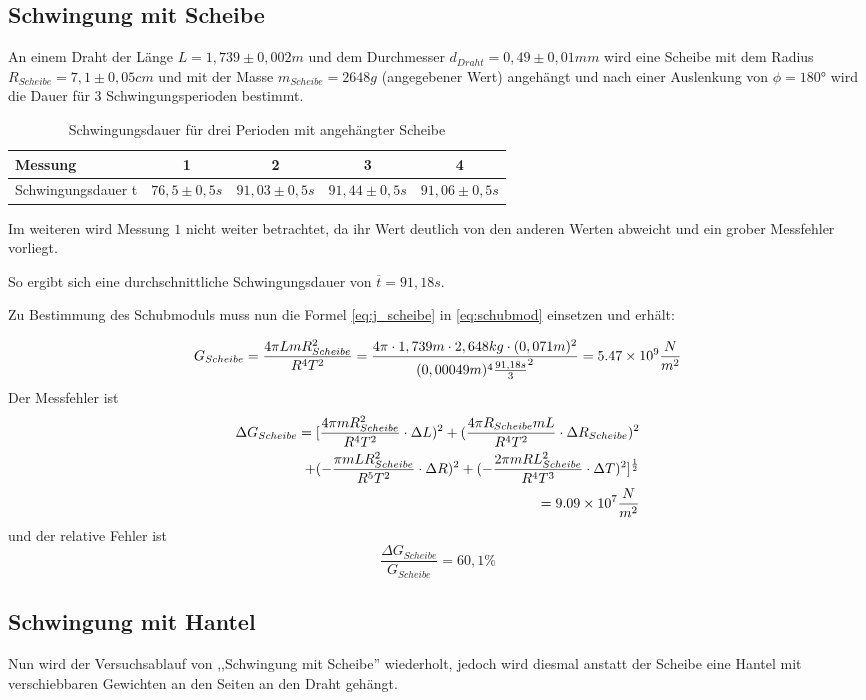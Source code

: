 \subsection{Schwingung mit Scheibe}
An einem Draht der Länge $L=1,739 \pm 0,002 m$ und dem Durchmesser $d_{Draht}= 0,49 \pm 0,01 mm$ wird eine Scheibe mit dem Radius $R_{Scheibe}= 7,1 \pm 0,05 cm$ und mit der Masse $m_{Scheibe}=2648g$ (angegebener Wert) angehängt und nach einer Auslenkung von $\phi =180$° wird die Dauer für 3 Schwingungsperioden bestimmt.
\begin{table}[H]
  \centering
  \begin{tabular}{l | c | c | c | c}
    Messung & 1 & 2& 3 & 4 \\ \hline
    Schwingungsdauer t & $76,5 \pm 0,5 s $ & $91,03\pm 0,5 s $ & $91,44 \pm 0,5 s $ & $91,06\pm 0,5 s $
  \end{tabular}
  \caption{Schwingungsdauer für drei Perioden mit angehängter Scheibe}
  \label{tab:schwingdauerscheibe}
\end{table}
Im weiteren wird Messung $1$ nicht weiter betrachtet, da ihr Wert deutlich von den anderen Werten abweicht und ein grober Messfehler vorliegt.

So ergibt sich eine durchschnittliche  Schwingungsdauer von $\overline{t}=91,18s$.

Zu Bestimmung des Schubmoduls muss nun die Formel \ref{eq:j_scheibe} in \ref{eq:schubmod} einsetzen und erhält:

\begin{equation}
G_{Scheibe}=\frac{4\pi LmR_{Scheibe}^2}{R^4T^2}= \frac{4\pi\cdot1,739m\cdot2,648kg\cdot(0,071m)^2}{(0,00049m)^4\frac{91,18s}{3}^2}=\num{5,47d9} \frac{N}{m^2}
\end{equation}
Der Messfehler ist
\begin{equation}
\begin{split}
\Delta G_{Scheibe}=[\frac{4\pi mR_{Scheibe}^2}{R^4T^2}\cdot\Delta L)^2+(\frac{4\pi R_{Scheibe}mL}{R^4T^2}\cdot\Delta R_{Scheibe})^2\\+(-\frac{\pi mLR_{Scheibe}^2}{R^5T^2}\cdot\Delta R)^2+(-\frac{2\pi mRL_{Scheibe}^2}{R^4T^3}\cdot\Delta T)^2]^{\frac{1}{2}}\\=\num{9,09d7}\frac{N}{m^2}
\end{split}
\end{equation}
und der relative Fehler ist
\begin{equation}
\frac{\Delta G_{Scheibe}}{G_{Scheibe}}=60,1\%
\end{equation}
\subsection{Schwingung mit Hantel}
Nun wird der Versuchsablauf von ,,Schwingung mit Scheibe'' wiederholt, jedoch wird diesmal anstatt der Scheibe eine Hantel mit verschiebbaren Gewichten an den Seiten an den Draht gehängt.

